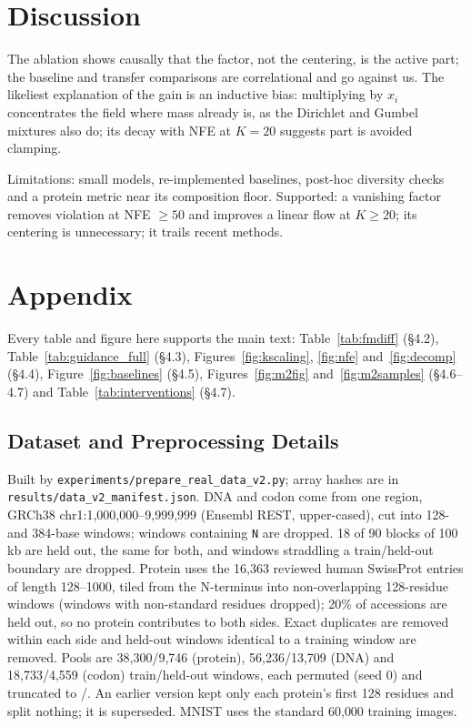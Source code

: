 \documentclass{article}
\begin{document}
\section{Discussion}
The ablation shows causally that the factor, not the centering, is the active part; the baseline
and transfer comparisons are correlational and go against us. The likeliest explanation of the gain
is an inductive bias: multiplying by $x_i$ concentrates the field where mass already is, as the
Dirichlet and Gumbel mixtures also do; its decay with NFE at $K=20$ suggests part is avoided clamping.

Limitations: small models, re-implemented baselines, post-hoc diversity checks and a protein metric
near its composition floor. Supported: a vanishing factor removes violation at NFE $\ge50$ and
improves a linear flow at $K\ge20$; its centering is unnecessary; it trails recent methods.




\newpage
\appendix
\renewcommand{\thetable}{S\arabic{table}}\setcounter{table}{0}
\renewcommand{\thefigure}{S\arabic{figure}}\setcounter{figure}{0}
\section{Appendix}
Every table and figure here supports the main text: Table~\ref{tab:fmdiff} (\S4.2),
Table~\ref{tab:guidance_full} (\S4.3), Figures~\ref{fig:kscaling}, \ref{fig:nfe} and~\ref{fig:decomp}
(\S4.4), Figure~\ref{fig:baselines} (\S4.5), Figures~\ref{fig:m2fig} and~\ref{fig:m2samples}
(\S4.6--4.7) and Table~\ref{tab:interventions} (\S4.7).

\subsection{Dataset and Preprocessing Details}
Built by \texttt{experiments/prepare\_real\_data\_v2.py}; array hashes are in
\texttt{results/data\_v2\_manifest.json}. DNA and codon come from one region, GRCh38
chr1:1{,}000{,}000--9{,}999{,}999 (Ensembl REST, upper-cased), cut into 128- and 384-base windows;
windows containing \texttt{N} are dropped. 18 of 90 blocks of 100\,kb are held out, the same for
both, and windows straddling a train/held-out boundary are dropped. Protein uses the 16{,}363
reviewed human SwissProt entries of length 128--1000, tiled from the N-terminus into
non-overlapping 128-residue windows (windows with non-standard residues dropped); 20\% of
accessions are held out, so no protein contributes to both sides. Exact duplicates are removed
within each side and held-out windows identical to a training window are removed. Pools are
38{,}300/9{,}746 (protein), 56{,}236/13{,}709 (DNA) and 18{,}733/4{,}559 (codon) train/held-out
windows, each permuted (seed 0) and truncated to \MOneTrain/\MOneHeldout. An earlier version kept only
each protein's first 128 residues and split nothing; it is superseded. MNIST uses the standard
60{,}000 training images.
\end{document}
